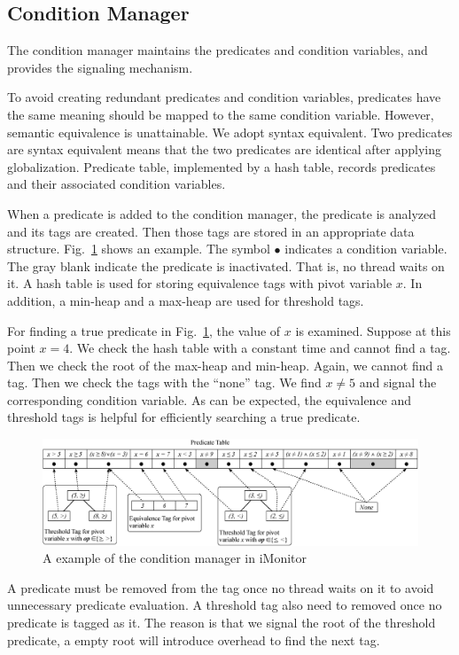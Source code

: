 \documentclass[preprint]{sigplanconf}
\begin{document}
\subsection{Condition Manager}
The condition manager maintains the predicates and condition variables, and
provides the signaling mechanism. 

To avoid creating redundant predicates and condition variables, predicates have 
the same meaning should be mapped to the same condition variable. However, 
semantic equivalence is unattainable. We adopt syntax equivalent. Two 
predicates are syntax equivalent means that the two predicates
are identical after applying globalization. Predicate table, implemented by a
hash table, records predicates and their associated condition variables. 

When a predicate is added to the condition manager, the predicate is analyzed
and its tags are created. Then those tags are stored in an appropriate data
structure. Fig.~\ref{fig:mgr} shows an example. The symbol $\bullet$ indicates 
a condition variable. The gray blank indicate the predicate is inactivated.
That is, no thread waits on it. A hash table is used for
storing equivalence tags with pivot variable $x$. In addition, a min-heap and a
max-heap are used for threshold tags. 

For finding a true predicate in Fig.~\ref{fig:mgr}, the value of $x$ is 
examined. Suppose at this point $x=4$. We check the hash table with a
constant time and cannot find a tag. Then we check the root of the max-heap and 
min-heap. Again, we cannot find a tag. Then we check the tags with the ``none''
tag. We find $x \ne 5$ and signal the corresponding condition variable. As can
be expected, the equivalence and threshold tags is helpful for efficiently
searching a true predicate.  


\begin{figure}[ht!]
  \centering
  \includegraphics[width=180mm]{fig/manager.eps}
  \caption{A example of the condition manager in iMonitor}
  \label{fig:mgr}
\end{figure}

A predicate must be removed from the tag once no thread waits on 
it to avoid unnecessary predicate evaluation. A threshold tag also need to
removed once no predicate is tagged as it. The reason is that 
we signal the root of the threshold predicate, a empty root 
will introduce overhead to find the next tag. 
\end{document}
